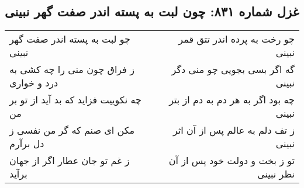 \begin{center}
\section*{غزل شماره ۸۳۱: چون لبت به پسته اندر صفت گهر نبینی}
\label{sec:831}
\begin{longtable}{l p{0.5cm} r}
چو لبت به پسته اندر صفت گهر نبینی
&&
چو رخت به پرده اندر تتق قمر نبینی
\\
ز فراق چون منی را چه کشی به درد و خواری
&&
گه اگر بسی بجویی چو منی دگر نبینی
\\
چه نکوییت فزاید که بد آید از تو بر من
&&
چه بود اگر به هر دم به دم از بتر نبینی
\\
مکن ای صنم که گر من نفسی ز دل برآرم
&&
ز تف دلم به عالم پس از آن اثر نبینی
\\
ز غم تو جان عطار اگر از جهان برآید
&&
تو ز بخت و دولت خود پس از آن نظر نبینی
\\
\end{longtable}
\end{center}
